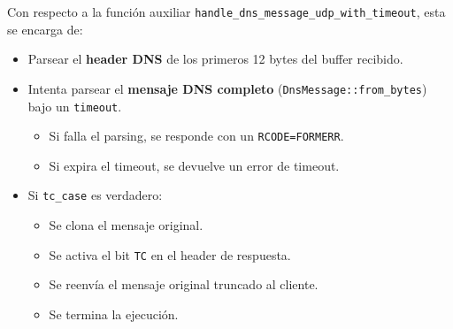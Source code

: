 Con respecto a la función auxiliar \texttt{handle\_dns\_message\_udp\_with\_timeout}, esta se encarga de:

\begin{itemize}
    \item Parsear el \textbf{header DNS} de los primeros 12 bytes del buffer recibido.  
    \item Intenta parsear el \textbf{mensaje DNS completo} (\texttt{DnsMessage::from\_bytes}) bajo un \texttt{timeout}.
    \begin{itemize}
        \item Si falla el parsing, se responde con un \texttt{RCODE=FORMERR}.
        \item Si expira el timeout, se devuelve un error de timeout.
    \end{itemize}

    \item Si \texttt{tc\_case} es verdadero:
    \begin{itemize}
        \item Se clona el mensaje original.
        \item Se activa el bit \texttt{TC} en el header de respuesta.
        \item Se reenvía el mensaje original truncado al cliente.
        \item Se termina la ejecución.
    \end{itemize}


\end{itemize}
